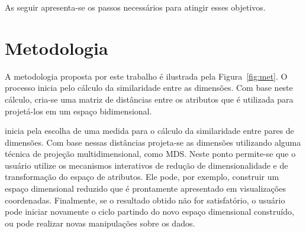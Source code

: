 As seguir apresenta-se os passos necessários para atingir esses objetivos.

\section{Metodologia}

A metodologia proposta por este trabalho é ilustrada pela Figura~\ref{fig:met}. O processo inicia pelo cálculo da similaridade entre as dimensões. Com base neste cálculo, cria-se uma matriz de distâncias entre os atributos que é utilizada para projetá-los em um espaço bidimensional.   

inicia pela escolha de uma medida para o cálculo da similaridade entre pares de dimensões. Com base nessas distâncias projeta-se as dimensões utilizando alguma técnica de projeção multidimensional, como MDS. Neste ponto permite-se que o usuário utilize os mecanismos interativos de redução de dimensionalidade e de transformação do espaço de atributos. Ele pode, por exemplo, construir um espaço dimensional reduzido que é prontamente apresentado em visualizações coordenadas. Finalmente, se o resultado obtido não for satisfatório, o usuário pode iniciar novamente o ciclo partindo do novo espaço dimensional construído, ou pode realizar novas manipulações sobre os dados.


